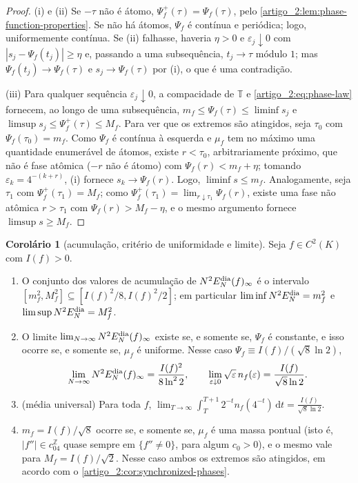\documentclass[12pt,a4paper]{article}
\theoremstyle{preciso}
\theoremstyle{definition}
\newcommand{\dd}{\,\mathrm{d}}
\theoremstyle{preciso}
\theoremstyle{preciso}
\theoremstyle{preciso}
\theoremstyle{preciso}
\newtheorem{corollary}[teorema]{Corolário}
\theoremstyle{definition}
\theoremstyle{preciso}
\theoremstyle{definition}
\theoremstyle{preciso}
\theoremstyle{preciso}
\theoremstyle{definition}
\begin{document}
\begin{proof}
(i) e (ii) Se $-\tau$ não é átomo, $\Psi_f^+(\tau)=\Psi_f(\tau)$, pelo
\cref{artigo_2:lem:phase-function-properties}. Se não há átomos, $\Psi_f$ é contínua e
periódica; logo, uniformemente contínua. Se (ii) falhasse, haveria $\eta>0$ e
$\varepsilon_j\downarrow0$ com $|s_j-\Psi_f(t_j)|\ge\eta$ e, passando a uma
subsequência, $t_j\to\tau$ módulo $1$; mas $\Psi_f(t_j)\to\Psi_f(\tau)$ e $s_j\to\Psi_f(\tau)$
por (i), o que é uma contradição.

(iii) Para qualquer sequência $\varepsilon_j\downarrow0$, a compacidade de
$\mathbb T$ e \eqref{artigo_2:eq:phase-law} fornecem, ao longo de uma subsequência,
$m_f\le\Psi_f(\tau)\le\liminf s_j$ e $\limsup s_j\le\Psi_f^+(\tau)\le M_f$.
Para ver que os extremos são atingidos, seja $\tau_0$ com $\Psi_f(\tau_0)=m_f$.
Como $\Psi_f$ é contínua à esquerda e $\mu_f$ tem no máximo uma quantidade
enumerável de átomos, existe $r<\tau_0$, arbitrariamente próximo, que não é
fase atômica ($-r$ não é átomo) com $\Psi_f(r)<m_f+\eta$; tomando
$\varepsilon_k=4^{-(k+r)}$, (i) fornece $s_k\to\Psi_f(r)$. Logo,
$\liminf s\le m_f$. Analogamente, seja $\tau_1$ com $\Psi_f^+(\tau_1)=M_f$; como
$\Psi_f^+(\tau_1)=\lim_{r\downarrow\tau_1}\Psi_f(r)$, existe uma fase não
atômica $r>\tau_1$ com $\Psi_f(r)>M_f-\eta$, e o mesmo argumento fornece
$\limsup s\ge M_f$.
\end{proof}

\begin{corollary}[acumulação, critério de uniformidade e limite]\label{map:artigo_2:12.8}
\label{artigo_2:cor:phase-accumulation}
Seja $f\in C^2(K)$ com $I(f)>0$.
\begin{enumerate}[label=(\alph*)]
\item O conjunto dos valores de acumulação de $N^2E_N^{\rm dia}(f)_\infty$ é o
 intervalo $[m_f^2,M_f^2]\subseteq[I(f)^2/8,I(f)^2/2]$; em particular
 $\liminf N^2E_N^{\rm dia}=m_f^2$ e $\limsup N^2E_N^{\rm dia}=M_f^2$.
\item O limite $\lim_{N\to\infty}N^2E_N^{\rm dia}(f)_\infty$ existe se, e somente
 se, $\Psi_f$ é constante, e isso ocorre se, e somente se, $\mu_f$ é uniforme.
 Nesse caso $\Psi_f\equiv I(f)/(\sqrt8\ln2)$,
 \[
  \lim_{N\to\infty}N^2E_N^{\rm dia}(f)_\infty=\frac{I(f)^2}{8\ln^22},
  \qquad
  \lim_{\varepsilon\downarrow0}\sqrt\varepsilon\,n_f(\varepsilon)=\frac{I(f)}{\sqrt8\ln2}.
 \]
\item (média universal) Para toda $f$,
 $\displaystyle\lim_{T\to\infty}\int_T^{T+1}2^{-t}n_f(4^{-t})\dd t=\frac{I(f)}{\sqrt8\ln2}$.
\item $m_f=I(f)/\sqrt8$ ocorre se, e somente se, $\mu_f$ é uma massa pontual
 (isto é, $|f''|\in c_04^{\mathbb Z}$ quase sempre em $\{f''\ne0\}$, para
 algum $c_0>0$), e o mesmo vale para $M_f=I(f)/\sqrt2$. Nesse caso ambos os
 extremos são atingidos, em acordo com o \cref{artigo_2:cor:synchronized-phases}.
\end{enumerate}
\end{corollary}
\end{document}

